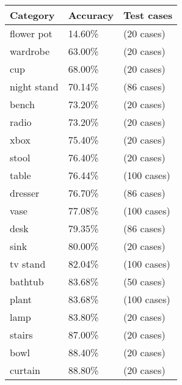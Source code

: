 \begin{table}[]
	\begin{tabular}[t]{lll}
		\hline
		\textbf{Category} & \textbf{Accuracy} & \textbf{Test cases} \\ \hline
		flower pot        & 14.60\%        & (20 cases)    \\
		wardrobe          & 63.00\%        & (20 cases)    \\
		cup               & 68.00\%        & (20 cases)    \\
		night stand       & 70.14\%        & (86 cases)    \\
		bench             & 73.20\%        & (20 cases)    \\
		radio             & 73.20\%        & (20 cases)    \\
		xbox              & 75.40\%        & (20 cases)    \\
		stool             & 76.40\%        & (20 cases)    \\
		table             & 76.44\%        & (100 cases)   \\
		dresser           & 76.70\%        & (86 cases)    \\
		vase              & 77.08\%        & (100 cases)   \\
		desk              & 79.35\%        & (86 cases)    \\
		sink              & 80.00\%        & (20 cases)    \\
		tv stand          & 82.04\%        & (100 cases)   \\
		bathtub           & 83.68\%        & (50 cases)    \\
		plant             & 83.68\%        & (100 cases)   \\
		lamp              & 83.80\%        & (20 cases)    \\
		stairs            & 87.00\%        & (20 cases)    \\
		bowl              & 88.40\%        & (20 cases)    \\
		curtain           & 88.80\%        & (20 cases)   


\end{tabular}
\end{table}
